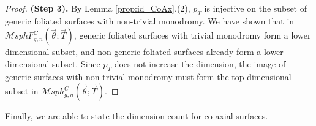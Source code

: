\documentclass[pdflatex,sn-mathphys]{sn-jnl}%
\numberwithin{equation}{section}
\theoremstyle{thmstyleone}%
\newcommand{\MsphgnCT}{\mathcal{M}sph_{g,n}^C(\vec{\theta};\vec{T})}
\newcommand{\MsphgnCFT}{\mathcal{M}sphF_{g,n}^C(\vec{\theta};\vec{T})}
\begin{document}
\begin{proof}
    \medskip
    \textbf{(Step 3).} By Lemma \ref{prop:id_CoAx}.(2), $p_T$ is injective on the subset of generic foliated surfaces with non-trivial monodromy. We have shown that in $\MsphgnCFT$, generic foliated surfaces with trivial monodromy form a lower dimensional subset, and non-generic foliated surfaces already form a lower dimensional subset. Since $p_T$ does not increase the dimension, the image of generic surfaces with non-trivial monodromy must form the top dimensional subset in $\MsphgnCT$.
\end{proof}

Finally, we are able to state the dimension count for co-axial surfaces.
\end{document}
